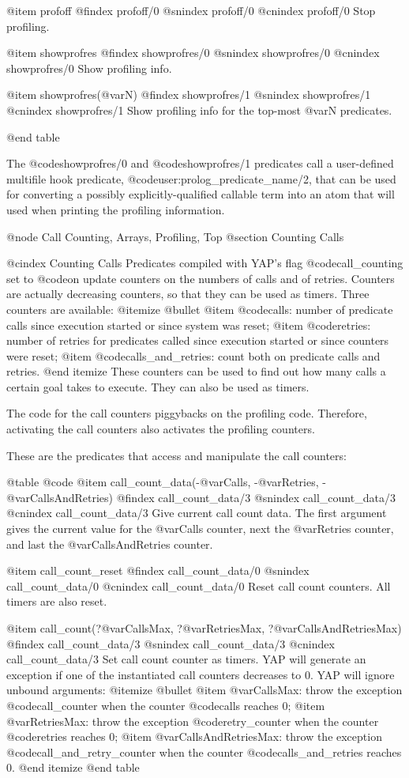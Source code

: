 {{{{{{@item profoff
@findex profoff/0
@snindex profoff/0
@cnindex profoff/0
Stop profiling.

@item showprofres
@findex showprofres/0
@snindex showprofres/0
@cnindex showprofres/0
Show profiling info.

@item showprofres(@var{N})
@findex showprofres/1
@snindex showprofres/1
@cnindex showprofres/1
Show profiling info for the top-most @var{N} predicates.

@end table

The @code{showprofres/0} and @code{showprofres/1} predicates call a user-defined multifile hook predicate, @code{user:prolog_predicate_name/2}, that can be used for converting a possibly explicitly-qualified callable term into an atom that will used when printing the profiling information.

@node Call Counting, Arrays, Profiling, Top
@section Counting Calls

@cindex Counting Calls
Predicates compiled with YAP's flag @code{call_counting} set to
@code{on} update counters on the numbers of calls and of
retries. Counters are actually decreasing counters, so that they can be
used as timers.  Three counters are available:
@itemize @bullet
@item @code{calls}: number of predicate calls since execution started or since
system was reset; 
@item @code{retries}: number of retries for predicates called since
execution started or since counters were reset;
@item @code{calls_and_retries}: count both on predicate calls and
retries.
@end itemize
These counters can be used to find out how many calls a certain
goal takes to execute. They can also be used as timers.

The code for the call counters piggybacks on the profiling
code. Therefore, activating the call counters also activates the profiling
counters.

These are  the predicates that access and manipulate the call counters:

@table @code
@item call_count_data(-@var{Calls}, -@var{Retries}, -@var{CallsAndRetries})
@findex call_count_data/3
@snindex call_count_data/3
@cnindex call_count_data/3
Give current call count data. The first argument gives the current value
for the @var{Calls} counter, next the @var{Retries} counter, and last
the @var{CallsAndRetries} counter.

@item call_count_reset
@findex call_count_data/0
@snindex call_count_data/0
@cnindex call_count_data/0
Reset call count counters. All timers are also reset.

@item call_count(?@var{CallsMax}, ?@var{RetriesMax}, ?@var{CallsAndRetriesMax})
@findex call_count_data/3
@snindex call_count_data/3
@cnindex call_count_data/3
Set call count counter as timers. YAP will generate an exception
if one of the instantiated call counters decreases to 0. YAP will ignore
unbound arguments:
@itemize @bullet
@item @var{CallsMax}: throw the exception @code{call_counter} when the
counter @code{calls} reaches 0;
@item @var{RetriesMax}: throw the exception @code{retry_counter} when the
counter @code{retries} reaches 0;
@item @var{CallsAndRetriesMax}: throw the exception
@code{call_and_retry_counter} when the counter @code{calls_and_retries}
reaches 0.
@end itemize
@end table

}}}}}}
